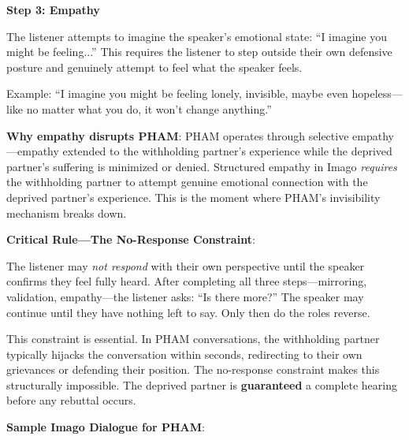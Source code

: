 \documentclass[12pt,openany]{book}
\numberwithin{equation}{chapter}
\begin{document}
\textbf{Step 3: Empathy}

The listener attempts to imagine the speaker's emotional state: ``I imagine you might be feeling...'' This requires the listener to step outside their own defensive posture and genuinely attempt to feel what the speaker feels.

Example: ``I imagine you might be feeling lonely, invisible, maybe even hopeless---like no matter what you do, it won't change anything.''

\textbf{Why empathy disrupts PHAM}: PHAM operates through selective empathy---empathy extended to the withholding partner's experience while the deprived partner's suffering is minimized or denied. Structured empathy in Imago \textit{requires} the withholding partner to attempt genuine emotional connection with the deprived partner's experience. This is the moment where PHAM's invisibility mechanism breaks down.

\textbf{Critical Rule---The No-Response Constraint}:

The listener may \textit{not respond} with their own perspective until the speaker confirms they feel fully heard. After completing all three steps---mirroring, validation, empathy---the listener asks: ``Is there more?'' The speaker may continue until they have nothing left to say. Only then do the roles reverse.

This constraint is essential. In PHAM conversations, the withholding partner typically hijacks the conversation within seconds, redirecting to their own grievances or defending their position. The no-response constraint makes this structurally impossible. The deprived partner is \textbf{guaranteed} a complete hearing before any rebuttal occurs.

\textbf{Sample Imago Dialogue for PHAM}:
\end{document}
